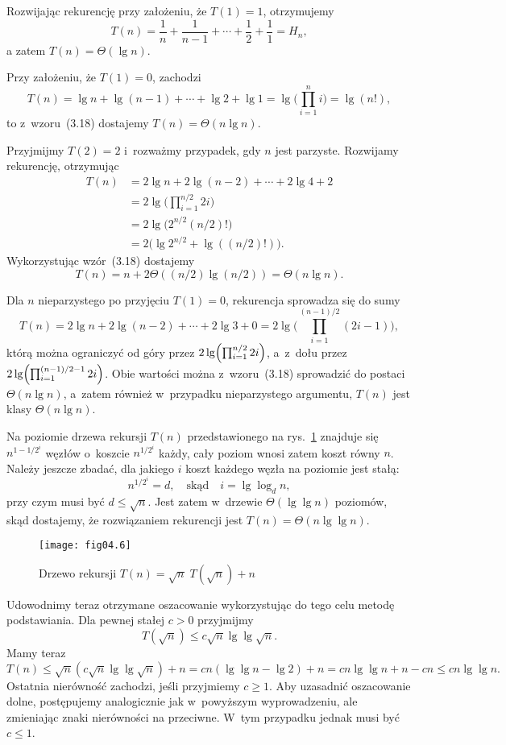 \subproblem %
Rozwijając rekurencję przy założeniu, że $T(1)=1$, otrzymujemy
\[
	T(n) = \frac{1}{n}+\frac{1}{n-1}+\cdots+\frac{1}{2}+\frac{1}{1} = H_n,
\]
a zatem $T(n)=\Theta(\lg n)$.

\subproblem %
Przy założeniu, że $T(1)=0$, zachodzi
\[
	T(n) = \lg n+\lg(n-1)+\cdots+\lg2+\lg 1 = \lg\biggl(\prod_{i=1}^ni\biggr) = \lg(n!),
\]
to z~wzoru~(3.18) dostajemy $T(n)=\Theta(n\lg n)$.

\subproblem %
Przyjmijmy $T(2)=2$ i~rozważmy przypadek, gdy $n$ jest parzyste. Rozwijamy rekurencję, otrzymując
\begin{align*}
	T(n) &= 2\lg n+2\lg(n-2)+\cdots+2\lg4+2 \\
	&= 2\lg\biggl(\prod_{i=1}^{n/2}2i\biggr) \\
	&= 2\lg\bigl(2^{n/2}(n/2)!\bigr) \\
	&= 2\bigl(\lg 2^{n/2}+\lg((n/2)!)\bigr).
\end{align*}
Wykorzystując wzór~(3.18) dostajemy
\[
	T(n) = n+2\Theta((n/2)\lg (n/2)) = \Theta(n\lg n).
\]

Dla $n$ nieparzystego po przyjęciu $T(1)=0$, rekurencja sprowadza się do sumy
\[
    T(n) = 2\lg n+2\lg(n-2)+\cdots+2\lg3+0 = 2\lg\biggl(\prod_{i=1}^{(n-1)/2}(2i-1)\biggr),
\]
którą można ograniczyć od góry przez $2\lg\Bigl(\prod_{i=1}^{n/2}2i\Bigr)$, a~z~dołu przez $2\lg\Bigl(\prod_{i=1}^{(n-1)/2-1}2i\Bigr)$. Obie wartości można z~wzoru~(3.18) sprowadzić do postaci $\Theta(n\lg n)$, a~zatem również w~przypadku nieparzystego argumentu, $T(n)$ jest klasy $\Theta(n\lg n)$.

\subproblem %
Na  poziomie drzewa rekursji $T(n)$ przedstawionego na rys.~\ref{fig:4-4j} znajduje się $n^{1-1/2^i}$ węzłów o~koszcie $n^{1/2^i}$ każdy, cały poziom wnosi zatem koszt równy $n$. Należy jeszcze zbadać, dla jakiego $i$ koszt każdego węzła na  poziomie jest stałą:
\[
	n^{1/2^i} = d, \quad\text{skąd}\quad i = \lg\log_dn,
\]
przy czym musi być $d\le\sqrt{n}$. Jest zatem w~drzewie $\Theta(\lg\lg n)$ poziomów, skąd dostajemy, że rozwiązaniem rekurencji jest $T(n)=\Theta(n\lg\lg n)$.
\begin{figure}[ht]
	\begin{center}
		\texttt{[image: fig04.6]}
	\caption{Drzewo rekursji $T(n)=\sqrt{n}\;T(\!\sqrt{n})+n$} \label{fig:4-4j}
	\end{center}
\end{figure}

Udowodnimy teraz otrzymane oszacowanie wykorzystując do tego celu metodę podstawiania. Dla pewnej stałej $c>0$ przyjmijmy
\[
    T(\!\sqrt{n}) \le c\sqrt{n}\lg\lg\sqrt{n}.
\]
Mamy teraz
\[
    T(n) \le \sqrt{n}\left(c\sqrt{n}\lg\lg\sqrt{n}\right)+n = cn(\lg\lg n-\lg2)+n = cn\lg\lg n+n-cn \le cn\lg\lg n.
\]
Ostatnia nierówność zachodzi, jeśli przyjmiemy $c\ge1$. Aby uzasadnić oszacowanie dolne, postępujemy analogicznie jak w~powyższym wyprowadzeniu, ale zmieniając znaki nierówności na przeciwne. W~tym przypadku jednak musi być $c\le1$.

